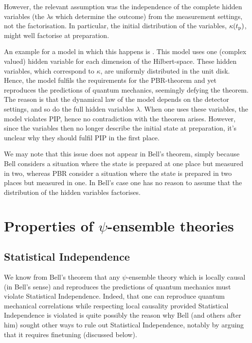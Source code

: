 \documentclass[superscriptaddress,twocolumn,floatfix,nofootinbib]{revtex4-2}
\begin{document}
However, the relevant assumption was the independence of the complete hidden variables (the $\lambda$s which determine the outcome) from the measurement settings, not the factorisation. In particular, the initial distribution of the variables, $\kappa(t_{\rm p})$, might well factorise at preparation. 

An example for a model in which this happens is \cite{Donadi2020SuperdetToy}. This model uses one (complex valued) hidden variable for each dimension of the Hilbert-space. These hidden variables, which correspond to $\kappa$, are uniformly distributed in the unit disk.  Hence, the model fulfils the requirements for the {\sc PBR}-theorem and yet reproduces the predictions of quantum mechanics, seemingly defying the theorem. The reason is that the dynamical law of the model depends on the detector settings, and so do the full hidden variables $\lambda$. When one uses these variables, the model violates {\sc PIP}, hence no contradiction with the theorem arises. However, since the variables then no longer describe the initial state at preparation, it's unclear why they should fulfil {\sc PIP} in the first place.

We may note that this issue does not appear in Bell's theorem, simply because Bell considers a situation where the state is prepared at one place but measured in two, whereas {\sc PBR} consider a situation where the state is prepared in two places but measured in one. In Bell's case one has no reason to assume that the distribution of the hidden variables factorises. 


\section{Properties of \texorpdfstring{$\psi$}{psi}-ensemble theories}
\label{SI}

\subsection{Statistical Independence}

We know from Bell's theorem that any $\psi$-ensemble theory which is locally causal (in Bell's sense) and reproduces the predictions of quantum mechanics must violate Statistical Independence. Indeed, that one can reproduce quantum mechanical correlations while respecting local causality provided Statistical Independence is violated is quite possibly the reason why Bell (and others after him) sought other ways to rule out Statistical Independence, notably by arguing that it requires finetuning (discussed below). 
\end{document}
